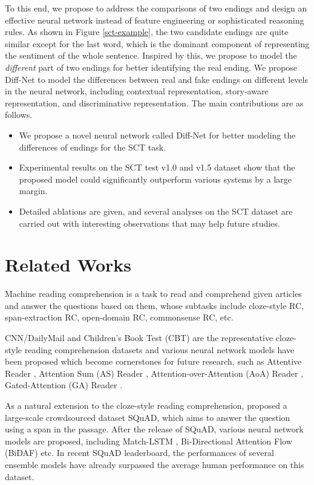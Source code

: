 \documentclass[letterpaper]{article} %
\begin{document}
To this end, we propose to address the comparisons of two endings and design an effective neural network instead of feature engineering or sophisticated reasoning rules.
As shown in Figure \ref{sct-example}, the two candidate endings are quite similar except for the last word, which is the dominant component of representing the sentiment of the whole sentence. Inspired by this, we propose to model the {\em different} part of two endings for better identifying the real ending.
We propose Diff-Net to model the differences between real and fake endings on different levels in the neural network, including contextual representation, story-aware  representation, and discriminative representation. 
The main contributions are as follows.
\begin{itemize}[leftmargin=*]
	\item We propose a novel neural network called Diff-Net for better modeling the differences of endings for the SCT task.
	\item Experimental results on the SCT test v1.0 and v1.5 dataset show that the proposed model could significantly outperform various systems by a large margin. 
	\item Detailed ablations are given, and several analyses on the SCT dataset are carried out with interesting observations that may help future studies.
\end{itemize}

\section{Related Works}\label{related-works}
Machine reading comprehension is a task to read and comprehend given articles and answer the questions based on them, whose subtasks include cloze-style RC, span-extraction RC, open-domain RC, commonsense RC, etc. 

CNN/DailyMail \cite{hermann-etal-2015} and Children's Book Test (CBT) \cite{hill-etal-2015} are the representative cloze-style reading comprehension datasets and various neural network models have been proposed which become cornerstones for future research, such as Attentive Reader \cite{hermann-etal-2015}, Attention Sum (AS) Reader \cite{kadlec-etal-2016}, Attention-over-Attention (AoA) Reader \cite{cui-acl2017-aoa}, Gated-Attention (GA) Reader \cite{dhingra-etal-2017}. 

As a natural extension to the cloze-style reading comprehension, \citeauthor{rajpurkar-etal-2016}  proposed a large-scale crowdsourced dataset SQuAD, which aims to answer the question using a span in the passage. After the release of SQuAD, various neural network models are proposed, including Match-LSTM \cite{wang-and-jiang-2016}, Bi-Directional Attention Flow (BiDAF) \cite{seo-etal-2016} etc. In recent SQuAD leaderboard, the performances of several ensemble models have already surpassed the average human performance on this dataset.
\end{document}
